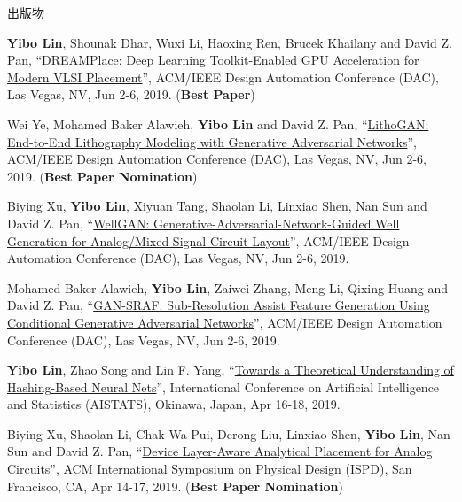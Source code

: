 \begin{rSection}{出版物}
\begin{description}[font=\normalfont]
\item[{[C27]}]{
        \textbf{Yibo Lin}, Shounak Dhar, Wuxi Li, Haoxing Ren, Brucek Khailany and David Z. Pan, 
    ``\href{https://doi.org/10.1145/3316781.3317803}{DREAMPlace: Deep Learning Toolkit-Enabled GPU Acceleration for Modern VLSI Placement}'', 
    ACM/IEEE Design Automation Conference (DAC), Las Vegas, NV, Jun 2-6, 2019.
    (\textbf{Best Paper})
}
            

\item[{[C26]}]{
        Wei Ye, Mohamed Baker Alawieh, \textbf{Yibo Lin} and David Z. Pan, 
    ``\href{https://doi.org/10.1145/3316781.3317852}{LithoGAN: End-to-End Lithography Modeling with Generative Adversarial Networks}'', 
    ACM/IEEE Design Automation Conference (DAC), Las Vegas, NV, Jun 2-6, 2019.
    (\textbf{Best Paper Nomination})
}
            

\item[{[C25]}]{
        Biying Xu, \textbf{Yibo Lin}, Xiyuan Tang, Shaolan Li, Linxiao Shen, Nan Sun and David Z. Pan, 
    ``\href{https://doi.org/10.1145/3316781.3317930}{WellGAN: Generative-Adversarial-Network-Guided Well Generation for Analog/Mixed-Signal Circuit Layout}'', 
    ACM/IEEE Design Automation Conference (DAC), Las Vegas, NV, Jun 2-6, 2019.
    
}
            

\item[{[C24]}]{
        Mohamed Baker Alawieh, \textbf{Yibo Lin}, Zaiwei Zhang, Meng Li, Qixing Huang and David Z. Pan, 
    ``\href{https://doi.org/10.1145/3316781.3317832}{GAN-SRAF: Sub-Resolution Assist Feature Generation Using Conditional Generative Adversarial Networks}'', 
    ACM/IEEE Design Automation Conference (DAC), Las Vegas, NV, Jun 2-6, 2019.
    
}
            

\item[{[C23]}]{
        \textbf{Yibo Lin}, Zhao Song and Lin F. Yang, 
    ``\href{https://arxiv.org/abs/1812.10244}{Towards a Theoretical Understanding of Hashing-Based Neural Nets}'', 
    International Conference on Artificial Intelligence and Statistics (AISTATS), Okinawa, Japan, Apr 16-18, 2019.
    
}
            

\item[{[C22]}]{
        Biying Xu, Shaolan Li, Chak-Wa Pui, Derong Liu, Linxiao Shen, \textbf{Yibo Lin}, Nan Sun and David Z. Pan, 
    ``\href{https://doi.org/10.1145/3299902.3309751}{Device Layer-Aware Analytical Placement for Analog Circuits}'', 
    ACM International Symposium on Physical Design (ISPD), San Francisco, CA, Apr 14-17, 2019.
    (\textbf{Best Paper Nomination})
}
            


\end{description}
\end{rSection}
